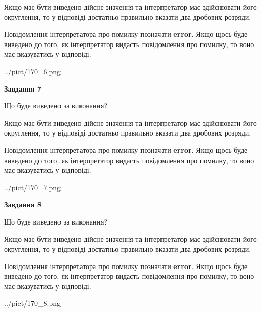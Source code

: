 \documentclass[12pt, ukrainian]{article}
\begin{document}
{\begin {Large}
Якщо має бути виведено дійсне значення та інтерпретатор має здійснювати його округлення, 
то у відповіді достатньо правильно вказати два дробових розряди.

Повідомлення інтерпретатора про помилку позначати \textbf{error}.
Якщо щось буде виведено до того, як інтерпретатор видасть повідомлення про помилку, 
то воно має вказуватись у відповіді. \par

\begin{center}
	{../pict/170_6.png}
\end{center}
\newpage

{\begin {center}\textbf{Завдання 7}\end {center}}\par
Що буде виведено за виконання? \par

Якщо має бути виведено дійсне значення та інтерпретатор має здійснювати його округлення, 
то у відповіді достатньо правильно вказати два дробових розряди.

Повідомлення інтерпретатора про помилку позначати \textbf{error}.
Якщо щось буде виведено до того, як інтерпретатор видасть повідомлення про помилку, 
то воно має вказуватись у відповіді. \par

\begin{center}
	{../pict/170_7.png}
\end{center}
\newpage

{\begin {center}\textbf{Завдання 8}\end {center}}\par
Що буде виведено за виконання? \par

Якщо має бути виведено дійсне значення та інтерпретатор має здійснювати його округлення, 
то у відповіді достатньо правильно вказати два дробових розряди.

Повідомлення інтерпретатора про помилку позначати \textbf{error}.
Якщо щось буде виведено до того, як інтерпретатор видасть повідомлення про помилку, 
то воно має вказуватись у відповіді. \par

\begin{center}
	{../pict/170_8.png}
\end{center}
\newpage


\end{Large}}
\end{document}
